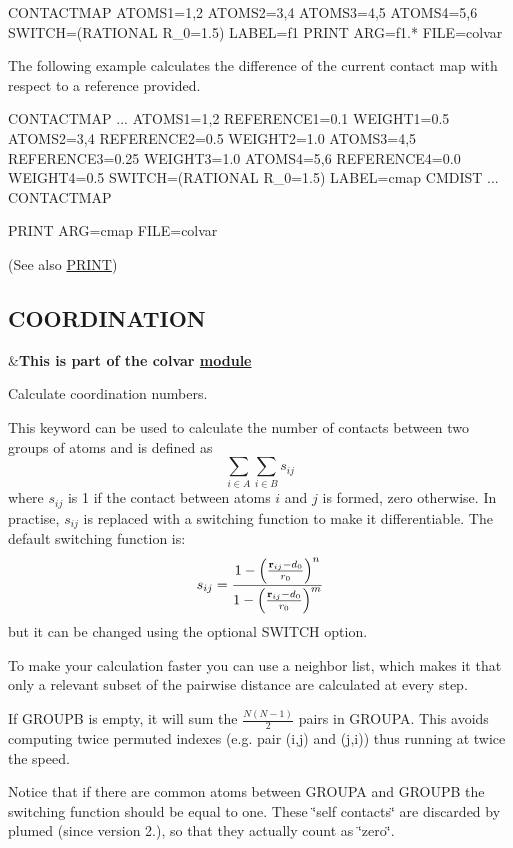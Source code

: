 \begin{DoxyVerb}CONTACTMAP ATOMS1=1,2 ATOMS2=3,4 ATOMS3=4,5 ATOMS4=5,6 SWITCH=(RATIONAL R_0=1.5) LABEL=f1
PRINT ARG=f1.* FILE=colvar
\end{DoxyVerb}


The following example calculates the difference of the current contact map with respect to a reference provided.

\begin{DoxyVerb}CONTACTMAP ...
ATOMS1=1,2 REFERENCE1=0.1 WEIGHT1=0.5 
ATOMS2=3,4 REFERENCE2=0.5 WEIGHT2=1.0 
ATOMS3=4,5 REFERENCE3=0.25 WEIGHT3=1.0 
ATOMS4=5,6 REFERENCE4=0.0 WEIGHT4=0.5 
SWITCH=(RATIONAL R_0=1.5) 
LABEL=cmap
CMDIST
... CONTACTMAP

PRINT ARG=cmap FILE=colvar
\end{DoxyVerb}
 (See also \hyperlink{PRINT}{P\+R\+I\+N\+T}) \hypertarget{COORDINATION}{}\subsection{C\+O\+O\+R\+D\+I\+N\+A\+T\+I\+O\+N}\label{COORDINATION}
\begin{TabularC}{2}
\hline
&{\bfseries  This is part of the colvar \hyperlink{mymodules}{module }}   \\
\end{TabularC}
Calculate coordination numbers.

This keyword can be used to calculate the number of contacts between two groups of atoms and is defined as \[ \sum_{i\in A} \sum_{i\in B} s_{ij} \] where $s_{ij}$ is 1 if the contact between atoms $i$ and $j$ is formed, zero otherwise. In practise, $s_{ij}$ is replaced with a switching function to make it differentiable. The default switching function is\+: \[ s_{ij} = \frac{ 1 - \left(\frac{{\bf r}_{ij}-d_0}{r_0}\right)^n } { 1 - \left(\frac{{\bf r}_{ij}-d_0}{r_0}\right)^m } \] but it can be changed using the optional S\+W\+I\+T\+C\+H option.

To make your calculation faster you can use a neighbor list, which makes it that only a relevant subset of the pairwise distance are calculated at every step.

If G\+R\+O\+U\+P\+B is empty, it will sum the $\frac{N(N-1)}{2}$ pairs in G\+R\+O\+U\+P\+A. This avoids computing twice permuted indexes (e.\+g. pair (i,j) and (j,i)) thus running at twice the speed.

Notice that if there are common atoms between G\+R\+O\+U\+P\+A and G\+R\+O\+U\+P\+B the switching function should be equal to one. These \char`\"{}self contacts\char`\"{} are discarded by plumed (since version 2.), so that they actually count as \char`\"{}zero\char`\"{}.

